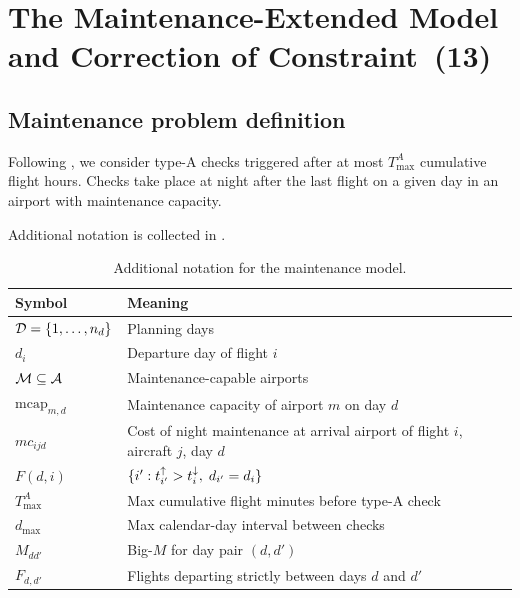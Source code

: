 \section{The Maintenance-Extended Model and Correction of Constraint~(13)}
\label{sec:maintenance}

\subsection{Maintenance problem definition}

Following \citet{khaled2018compact}, we consider type-A checks triggered after
at most $T^A_{\max}$ cumulative flight hours.  Checks take place at night
after the last flight on a given day in an airport with maintenance capacity.

Additional notation is collected in .

\begin{table}[t]
\centering\small
\caption{Additional notation for the maintenance model.}
\label{tab:maint_notation}
\begin{tabular}{lp{7cm}}
\toprule
Symbol & Meaning \\
\midrule
$\mathcal{D} = \{1,\ldots,n_d\}$      & Planning days \\
$d_i$                         & Departure day of flight $i$ \\
$\mathcal{M} \subseteq \mathcal{A}$            & Maintenance-capable airports \\
$\text{mcap}_{m,d}$           & Maintenance capacity of airport $m$ on day $d$ \\
$mc_{ijd}$                    & Cost of night maintenance at arrival airport of
                                flight $i$, aircraft $j$, day $d$ \\
$F(d,i)$                      & $\{i' : t^{\uparrow}_{i'} > t^{\downarrow}_{i},\; d_{i'} = d_i\}$ \\
$T^A_{\max}$                  & Max cumulative flight minutes before type-A check \\
$d_{\max}$                    & Max calendar-day interval between checks \\
$M_{dd'}$                     & Big-$M$ for day pair $(d,d')$ \\
$F_{d,d'}$                    & Flights departing strictly between days $d$ and $d'$ \\
\bottomrule
\end{tabular}
\end{table}

